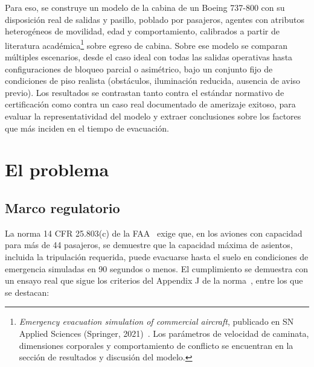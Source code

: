 \documentclass[a4paper, 11pt]{article}
\begin{document}
Para eso, se construye un modelo de la cabina de un Boeing 737-800 con su
disposici\'on real de salidas y pasillo, poblado por pasajeros, agentes con
atributos heterog\'eneos de movilidad, edad y comportamiento, calibrados a partir de
literatura acad\'emica\footnote{\textit{Emergency evacuation simulation of
commercial aircraft}, publicado en SN Applied Sciences (Springer,
2021)~\cite{gobbin2021}. Los par\'ametros de velocidad de caminata, dimensiones
corporales y comportamiento de conflicto se encuentran en la secci\'on de
resultados y discusi\'on del modelo.} sobre egreso de cabina. Sobre ese modelo se
comparan m\'ultiples escenarios, desde el caso ideal con todas las salidas
operativas hasta configuraciones de bloqueo parcial o asim\'etrico, bajo un
conjunto fijo de condiciones de piso realista (obst\'aculos, iluminaci\'on
reducida, ausencia de aviso previo). Los resultados se contrastan tanto contra el
est\'andar normativo de certificaci\'on como contra un caso real documentado de
amerizaje exitoso, para evaluar la representatividad del modelo y extraer
conclusiones sobre los factores que m\'as inciden en el tiempo de evacuaci\'on.

\newpage
\section{El problema}

\subsection{Marco regulatorio}\label{sub:marco}

La norma 14 CFR 25.803(c) de la FAA~\cite{cfr25803} exige que, en los aviones con
capacidad para m\'as de 44 pasajeros, se demuestre que la capacidad m\'axima de
asientos, incluida la tripulaci\'on requerida, puede evacuarse hasta el suelo en
condiciones de emergencia simuladas en 90 segundos o menos. El cumplimiento se
demuestra con un ensayo real que sigue los criterios del Appendix J de la
norma~\cite{cfrAppJ}, entre los que se destacan:
\end{document}
